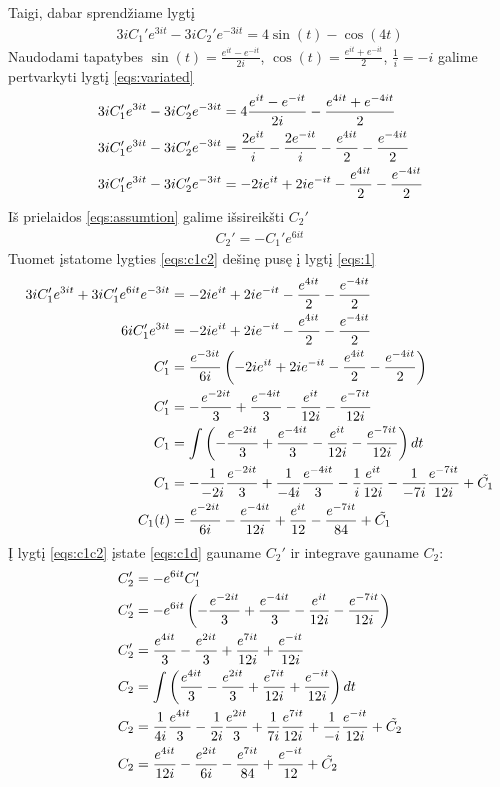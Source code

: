 \documentclass[11pt]{article}
\begin{document}
Taigi, dabar sprendžiame lygtį
\begin{align}
3iC_1'e^{3it}-3iC_2'e^{-3it}=4\sin(t)-\cos(4t)\label{eqs:variated}
\end{align}
Naudodami tapatybes $\sin(t)=\frac{e^{it}-e^{-it}}{2i}$, $\cos(t)=\frac{e^{it}+e^{-it}}{2}$, $\frac{1}{i}=-i$ galime pertvarkyti lygtį \eqref{eqs:variated}
\begin{align}
3iC_1'e^{3it}-3iC_2'e^{-3it}&=4\frac{e^{it}-e^{-it}}{2i}-\frac{e^{4it}+e^{-4it}}{2}\notag\\
3iC_1'e^{3it}-3iC_2'e^{-3it}&=\frac{2e^{it}}{i}-\frac{2e^{-it}}{i}-\frac{e^{4it}}{2}-\frac{e^{-4it}}{2}\notag\\
3iC_1'e^{3it}-3iC_2'e^{-3it}&=-2ie^{it}+2ie^{-it}-\frac{e^{4it}}{2}-\frac{e^{-4it}}{2}\label{eqs:1}
\end{align}
Iš prielaidos \eqref{eqs:assumtion} galime išsireikšti $C_2'$
\begin{align}
C_2'=-C_1'e^{6it} \label{eqs:c1c2}    
\end{align}
Tuomet įstatome lygties \eqref{eqs:c1c2} dešinę pusę į lygtį \eqref{eqs:1}
\begin{align}
3iC_1'e^{3it}+3iC_1'e^{6it}e^{-3it}&=-2ie^{it}+2ie^{-it}-\frac{e^{4it}}{2}-\frac{e^{-4it}}{2} \notag\\
6iC_1'e^{3it}&=-2ie^{it}+2ie^{-it}-\frac{e^{4it}}{2}-\frac{e^{-4it}}{2} \notag\\
C_1'&=\frac{e^{-3it}}{6i}\left(-2ie^{it}+2ie^{-it}-\frac{e^{4it}}{2}-\frac{e^{-4it}}{2}\right) \notag\\
C_1'&=-\frac{e^{-2it}}{3}+\frac{e^{-4it}}{3}-\frac{e^{it}}{12i}-\frac{e^{-7it}}{12i} \label{eqs:c1d}\\
C_1&=\int\left(-\frac{e^{-2it}}{3}+\frac{e^{-4it}}{3}-\frac{e^{it}}{12i}-\frac{e^{-7it}}{12i}\right)dt \notag\\
C_1&=-\frac{1}{-2i}\frac{e^{-2it}}{3}+\frac{1}{-4i}\frac{e^{-4it}}{3}-\frac{1}{i}\frac{e^{it}}{12i}-\frac{1}{-7i}\frac{e^{-7it}}{12i}+\tilde{C_1}\notag\\
C_1(t)&=\frac{e^{-2it}}{6i}-\frac{e^{-4it}}{12i}+\frac{e^{it}}{12}-\frac{e^{-7it}}{84}+\tilde{C_1} \label{eqs:c1}
\end{align}
Į lygtį \eqref{eqs:c1c2} įstate \eqref{eqs:c1d} gauname $C_2'$ ir integrave gauname $C_2$:
\begin{align}
C_2'&=-e^{6it}C_1'\notag\\
C_2'&=-e^{6it}\left(-\frac{e^{-2it}}{3}+\frac{e^{-4it}}{3}-\frac{e^{it}}{12i}-\frac{e^{-7it}}{12i}\right)\notag\\
C_2'&=\frac{e^{4it}}{3}-\frac{e^{2it}}{3}+\frac{e^{7it}}{12i}+\frac{e^{-it}}{12i}\\
C_2&=\int\left(\frac{e^{4it}}{3}-\frac{e^{2it}}{3}+\frac{e^{7it}}{12i}+\frac{e^{-it}}{12i}\right)dt\notag\\
C_2&=\frac{1}{4i}\frac{e^{4it}}{3}-\frac{1}{2i}\frac{e^{2it}}{3}+\frac{1}{7i}\frac{e^{7it}}{12i}+\frac{1}{-i}\frac{e^{-it}}{12i}+\tilde{C_2}\notag\\
C_2&=\frac{e^{4it}}{12i}-\frac{e^{2it}}{6i}-\frac{e^{7it}}{84}+\frac{e^{-it}}{12}+\tilde{C_2}
\end{align}
\end{document}
